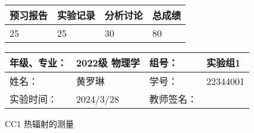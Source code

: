 \documentclass[dvipsnames, svgnames,a4paper,11pt]{article}
\begin{document}
	
	\begin{table}
		\renewcommand\arraystretch{1.7}
		\begin{tabularx}{\textwidth}{
				|X|X|X|X
				|X|X|X|X|}
			\hline
			\multicolumn{2}{|c|}{预习报告}&\multicolumn{2}{|c|}{实验记录}&\multicolumn{2}{|c|}{分析讨论}&\multicolumn{2}{|c|}{总成绩}\\
			\hline
			\LARGE25 & & \LARGE25 & & \LARGE30 & & \LARGE80 & \\
			\hline
		\end{tabularx}
	\end{table}
	
	\begin{table}
		\renewcommand\arraystretch{1.7}
		\begin{tabularx}{\textwidth}{|X|X|X|X|}
			\hline
			年级、专业： & 2022级 物理学 &组号： &实验组1 \\
			\hline
			姓名： &   黄罗琳 & 学号： &22344001   \\
			\hline
			实验时间： & 2024/3/28 & 教师签名： & \\
			\hline
		\end{tabularx}
	\end{table}
	
	\begin{center}
		\LARGE CC1 \quad 热辐射的测量

	\end{center}
	
	
\end{document}
